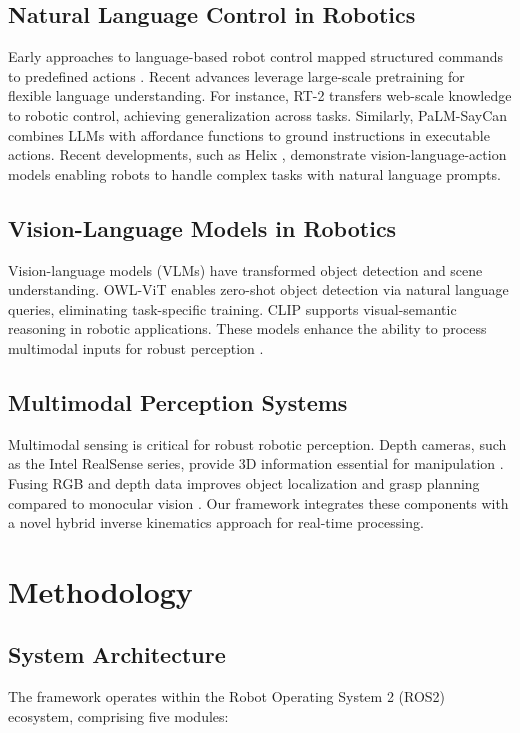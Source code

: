 \documentclass[conference]{IEEEtran}
\begin{document}
\subsection{Natural Language Control in Robotics}
Early approaches to language-based robot control mapped structured commands to predefined actions \cite{tellex2011understanding, paul2016efficient}. Recent advances leverage large-scale pretraining for flexible language understanding. For instance, RT-2 \cite{rt22023} transfers web-scale knowledge to robotic control, achieving generalization across tasks. Similarly, PaLM-SayCan \cite{saycan2022} combines LLMs with affordance functions to ground instructions in executable actions. Recent developments, such as Helix \cite{figure2025helix}, demonstrate vision-language-action models enabling robots to handle complex tasks with natural language prompts.

\subsection{Vision-Language Models in Robotics}
Vision-language models (VLMs) have transformed object detection and scene understanding. OWL-ViT \cite{minderer2022simple} enables zero-shot object detection via natural language queries, eliminating task-specific training. CLIP \cite{radford2021learning} supports visual-semantic reasoning in robotic applications. These models enhance the ability to process multimodal inputs for robust perception \cite{alayrac2022flamingo}.

\subsection{Multimodal Perception Systems}
Multimodal sensing is critical for robust robotic perception. Depth cameras, such as the Intel RealSense series, provide 3D information essential for manipulation \cite{keselman2017intel}. Fusing RGB and depth data improves object localization and grasp planning compared to monocular vision \cite{li2023grounding}. Our framework integrates these components with a novel hybrid inverse kinematics approach for real-time processing.

\section{Methodology}

\subsection{System Architecture}
The framework operates within the Robot Operating System 2 (ROS2) ecosystem, comprising five modules:
\end{document}

